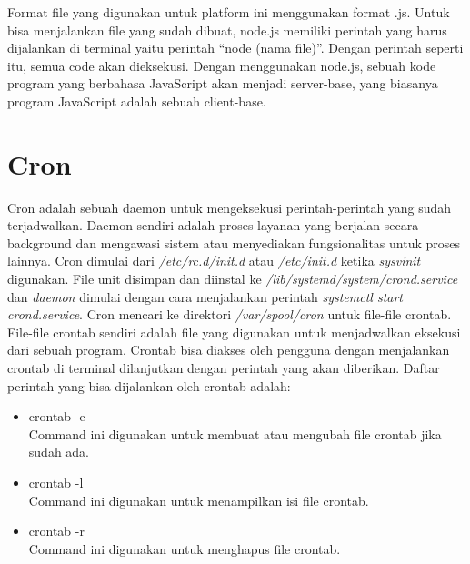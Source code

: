 Format file yang digunakan untuk platform ini menggunakan format .js. Untuk bisa menjalankan file yang sudah dibuat, node.js memiliki perintah yang harus dijalankan di terminal yaitu perintah ``node (nama file)''. Dengan perintah seperti itu, semua code akan dieksekusi. Dengan menggunakan node.js, sebuah kode program yang berbahasa JavaScript akan menjadi server-base, yang biasanya program JavaScript adalah sebuah client-base. 

 


\section{Cron}
Cron adalah sebuah daemon untuk mengeksekusi perintah-perintah yang sudah terjadwalkan. Daemon sendiri adalah proses layanan yang berjalan secara background dan mengawasi sistem atau menyediakan fungsionalitas untuk proses lainnya. Cron dimulai dari \textit{/etc/rc.d/init.d} atau \textit{/etc/init.d} ketika \textit{sysvinit} digunakan. File unit disimpan dan diinstal ke \textit{/lib/systemd/system/crond.service} dan \textit{daemon} dimulai dengan cara menjalankan perintah \textit{systemctl start crond.service}. Cron mencari ke direktori \textit{/var/spool/cron} untuk file-file crontab. File-file crontab sendiri adalah file yang digunakan untuk menjadwalkan eksekusi dari sebuah program. Crontab bisa diakses oleh pengguna dengan menjalankan crontab di terminal dilanjutkan dengan perintah yang akan diberikan. Daftar perintah yang bisa dijalankan oleh crontab adalah:
\begin{itemize}
	\item crontab -e\\
	Command ini digunakan untuk membuat atau mengubah file crontab jika sudah ada. 
	\item crontab -l\\
	Command ini digunakan untuk menampilkan isi file crontab.
	\item crontab -r\\
	Command ini digunakan untuk menghapus file crontab.
\end{itemize}

